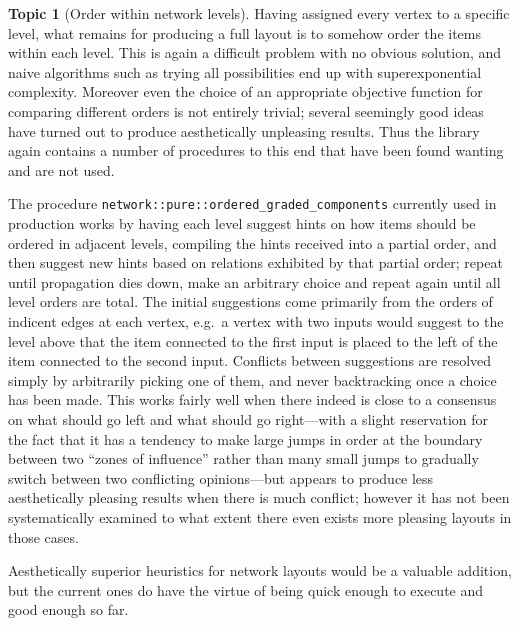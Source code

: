 \documentclass{article}
\theoremstyle{definition}
\newtheorem{topic}{Topic}
\begin{document}
\begin{topic}[Order within network levels] \label{Topic:LevelOrder}
  Having assigned every vertex to a specific level, what remains for 
  producing a full layout is to somehow order the items within each 
  level. This is again a difficult problem with no obvious solution, 
  and naive algorithms such as trying all possibilities end up with 
  superexponential complexity. Moreover even the choice of an 
  appropriate objective function for comparing different orders is 
  not entirely trivial; several seemingly good ideas have turned out 
  to produce aesthetically unpleasing results. Thus the library again 
  contains a number of procedures to this end that have been found 
  wanting and are not used.
  
  The procedure \verb|network::pure::ordered_graded_components| 
  currently used in production works by having each level suggest 
  hints on how items should be ordered in adjacent levels, compiling 
  the hints received into a partial order, and then suggest new hints 
  based on relations exhibited by that partial order; repeat until 
  propagation dies down, make an arbitrary choice and repeat again 
  until all level orders are total. The initial suggestions come 
  primarily from the orders of indicent edges at each vertex, e.g.~a 
  vertex with two inputs would suggest to the level above that the 
  item connected to the first input is placed to the left of the item 
  connected to the second input. Conflicts between suggestions are 
  resolved simply by arbitrarily picking one of them, and never 
  backtracking once a choice has been made. This works fairly well 
  when there indeed is close to a consensus on what should go left 
  and what should go right---with a slight reservation for the fact 
  that it has a tendency to make large jumps in order at the boundary 
  between two ``zones of influence'' rather than many small 
  jumps to gradually switch between two conflicting opinions---but 
  appears to produce less aesthetically pleasing results when there 
  is much conflict; however it has not been systematically examined 
  to what extent there even exists more pleasing layouts in those 
  cases.
  
  Aesthetically superior heuristics for network layouts would be a 
  valuable addition, but the current ones do have the virtue of being 
  quick enough to execute and good enough so far.
\end{topic}
\end{document}
